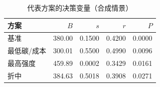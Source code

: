 \begin{table}[htbp]
  \centering
  \caption{代表方案的决策变量（合成情景）}
  \label{tab:decisions}
  \begin{tabular}{@{}lrrrr@{}}
    \toprule
    方案 & $B$ & $s$ & $r$ & $P$\\
    \midrule
    基准 & 380.00 & 0.1500 & 0.4200 & 0.0000\\
    最低碳/成本 & 300.01 & 0.5500 & 0.4990 & 0.0096\\
    最高强度 & 459.89 & 0.0002 & 0.3429 & 0.0161\\
    折中 & 384.63 & 0.5018 & 0.3908 & 0.0271\\
    \bottomrule
  \end{tabular}
\end{table}

